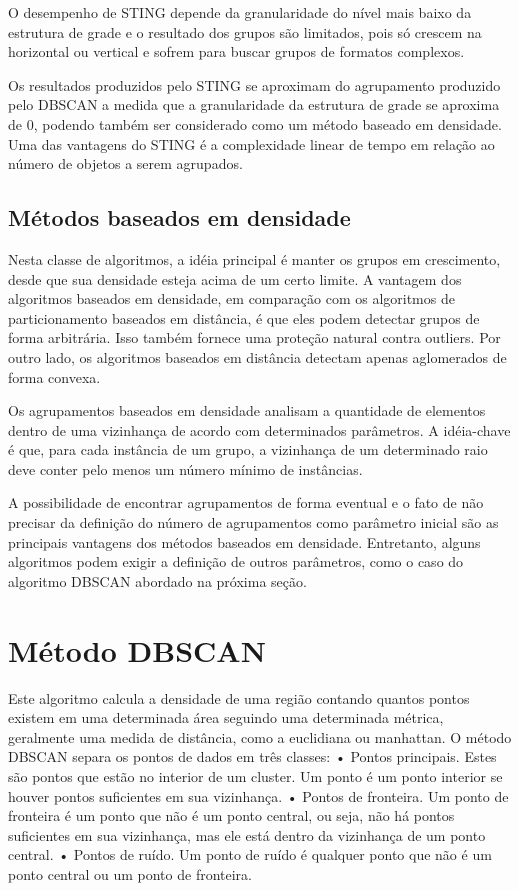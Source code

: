 O desempenho de STING depende da granularidade do nível mais baixo da estrutura de grade e o resultado dos
grupos são limitados, pois só crescem na horizontal ou vertical e sofrem para buscar grupos de formatos complexos.

Os resultados produzidos pelo STING se aproximam do agrupamento produzido pelo
DBSCAN a medida que a granularidade da estrutura de grade se aproxima de 0, podendo
também ser considerado como um método baseado em densidade.
Uma das vantagens do STING é a complexidade linear de tempo em relação ao número de objetos
a serem agrupados.

\subsection{Métodos baseados em densidade}
Nesta classe de algoritmos, a idéia principal é manter os grupos em crescimento, desde que sua densidade esteja acima de um certo limite. A vantagem dos algoritmos baseados em densidade, em comparação com os algoritmos de particionamento baseados em distância, é que eles podem detectar grupos de forma arbitrária. Isso também fornece uma proteção natural contra outliers. Por outro lado, os algoritmos baseados em distância detectam apenas aglomerados de forma convexa.

Os agrupamentos baseados em densidade analisam a quantidade de elementos dentro de uma vizinhança de acordo com determinados parâmetros. A idéia-chave é que, para cada instância de um grupo, a vizinhança de um determinado raio deve conter pelo menos um número mínimo de instâncias.

A possibilidade de encontrar agrupamentos de forma eventual e o fato de não precisar da definição do número de agrupamentos \cite{yip2005} como parâmetro inicial são as principais vantagens dos métodos baseados em densidade. Entretanto, alguns algoritmos podem exigir a definição de outros parâmetros, como o caso do algoritmo DBSCAN \cite{ESTER1996} abordado na próxima seção.

\section{Método DBSCAN}
\label{dbscan}

Este algoritmo calcula a densidade de uma região contando quantos pontos existem em uma determinada área seguindo uma determinada métrica, geralmente uma medida de distância, como a euclidiana ou manhattan. O método DBSCAN separa os pontos de dados em três classes:
• Pontos principais. Estes são pontos que estão no interior de um cluster. Um ponto é um ponto interior se houver pontos suficientes em sua vizinhança.
• Pontos de fronteira. Um ponto de fronteira é um ponto que não é um ponto central, ou seja, não há pontos suficientes em sua vizinhança, mas ele está dentro da vizinhança de um ponto central.
• Pontos de ruído. Um ponto de ruído é qualquer ponto que não é um ponto central ou um ponto de fronteira.

